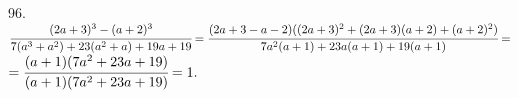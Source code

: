 96. $\cfrac{(2a+3)^3-(a+2)^3}{7(a^3+a^2)+23(a^2+a)+19a+19}=
\cfrac{(2a+3-a-2)((2a+3)^2+(2a+3)(a+2)+(a+2)^2)}{7a^2(a+1)+23a(a+1)+19(a+1)}=$\\$=
\cfrac{(a+1)(7a^2+23a+19)}{(a+1)(7a^2+23a+19)}=1.$\\
